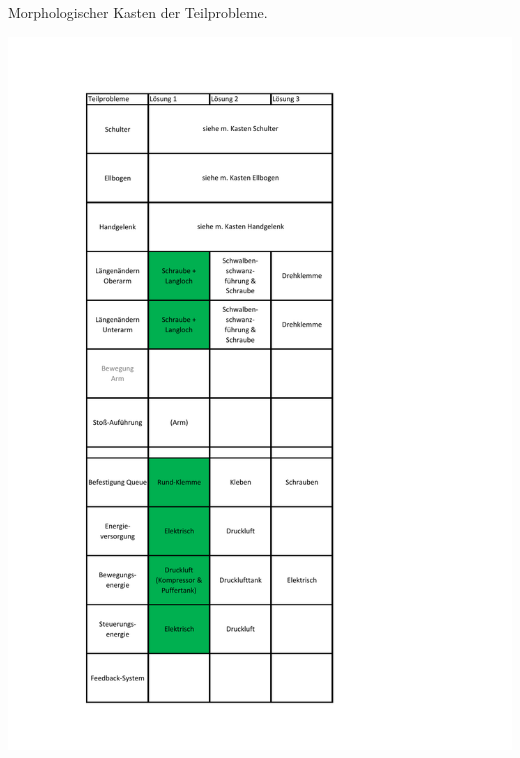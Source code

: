 	\begin{table}[h]
		\centering
		\caption[Morphologischer Kasten der Teilprobleme]{Morphologischer Kasten der Teilprobleme.}
		\centering
		\includegraphics[width=\textwidth]{"Abb/Morphologischer Kasten Teilprobleme"}
		\label{fig:morphologische-kasten-teilprobleme}
	\end{table}


